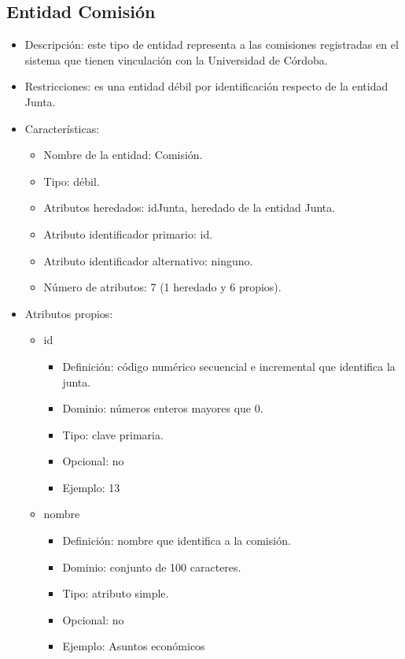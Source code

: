 \subsection{Entidad Comisión}
\begin{itemize}
    \item Descripción: este tipo de entidad representa a las comisiones registradas en el sistema que tienen vinculación con la Universidad de Córdoba.
    \item Restricciones: es una entidad débil por identificación respecto de la entidad Junta.
    \item Características:
    \begin{itemize}
        \item Nombre de la entidad: Comisión.
        \item Tipo: débil.
        \item Atributos heredados: idJunta, heredado de la entidad Junta.
        \item Atributo identificador primario: id.
        \item Atributo identificador alternativo: ninguno.
        \item Número de atributos: 7 (1 heredado y 6 propios).
    \end{itemize}

    \item Atributos propios:
    \begin{itemize}
        \item id
        \begin{itemize}
            \item Definición: código numérico secuencial e incremental que identifica la junta.
            \item Dominio: números enteros mayores que 0.
            \item Tipo: clave primaria.
            \item Opcional: no
            \item Ejemplo: 13
        \end{itemize}

         \item nombre
        \begin{itemize}
            \item Definición: nombre que identifica a la comisión.
            \item Dominio: conjunto de 100 caracteres.
            \item Tipo: atributo simple.
            \item Opcional: no
            \item Ejemplo: Asuntos económicos
        \end{itemize}


\end{itemize}
\end{itemize}
